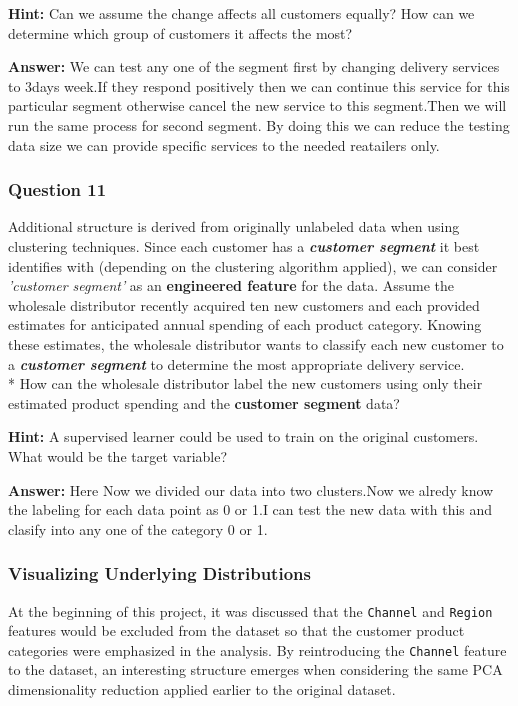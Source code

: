 \documentclass[11pt]{article}
\begin{document}
\textbf{Hint:} Can we assume the change affects all customers equally?
How can we determine which group of customers it affects the most?

    \textbf{Answer:} We can test any one of the segment first by changing
delivery services to 3days week.If they respond positively then we can
continue this service for this particular segment otherwise cancel the
new service to this segment.Then we will run the same process for second
segment. By doing this we can reduce the testing data size we can
provide specific services to the needed reatailers only.

    \subsubsection{Question 11}\label{question-11}

Additional structure is derived from originally unlabeled data when
using clustering techniques. Since each customer has a
\textbf{\emph{customer segment}} it best identifies with (depending on
the clustering algorithm applied), we can consider \emph{'customer
segment'} as an \textbf{engineered feature} for the data. Assume the
wholesale distributor recently acquired ten new customers and each
provided estimates for anticipated annual spending of each product
category. Knowing these estimates, the wholesale distributor wants to
classify each new customer to a \textbf{\emph{customer segment}} to
determine the most appropriate delivery service.\\
* How can the wholesale distributor label the new customers using only
their estimated product spending and the \textbf{customer segment} data?

\textbf{Hint:} A supervised learner could be used to train on the
original customers. What would be the target variable?

    \textbf{Answer:} Here Now we divided our data into two clusters.Now we
alredy know the labeling for each data point as 0 or 1.I can test the
new data with this and clasify into any one of the category 0 or 1.

    \subsubsection{Visualizing Underlying
Distributions}\label{visualizing-underlying-distributions}

At the beginning of this project, it was discussed that the
\texttt{\textquotesingle{}Channel\textquotesingle{}} and
\texttt{\textquotesingle{}Region\textquotesingle{}} features would be
excluded from the dataset so that the customer product categories were
emphasized in the analysis. By reintroducing the
\texttt{\textquotesingle{}Channel\textquotesingle{}} feature to the
dataset, an interesting structure emerges when considering the same PCA
dimensionality reduction applied earlier to the original dataset.
\end{document}
